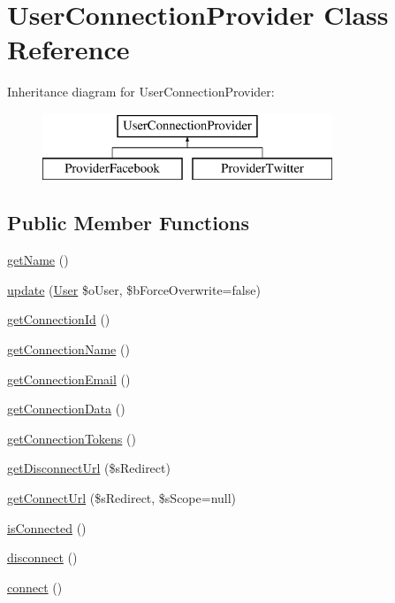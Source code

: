 \hypertarget{class_user_connection_provider}{\section{User\-Connection\-Provider Class Reference}
\label{class_user_connection_provider}
}
Inheritance diagram for User\-Connection\-Provider\-:\begin{figure}[H]
\begin{center}
\leavevmode
\includegraphics[height=2.000000cm]{class_user_connection_provider}
\end{center}
\end{figure}
\subsection*{Public Member Functions}
\begin{DoxyCompactItemize}
\item 
\hyperlink{class_user_connection_provider_a44ddc4806292a57a3d46267f85fcb8b2}{get\-Name} ()
\item 
\hyperlink{class_user_connection_provider_a8ba8b5a529e6f20c8b243368862120b8}{update} (\hyperlink{class_user}{User} \$o\-User, \$b\-Force\-Overwrite=false)
\item 
\hyperlink{class_user_connection_provider_ab1d2c9bb70f491f514b7c16c558f0777}{get\-Connection\-Id} ()
\item 
\hyperlink{class_user_connection_provider_a51cc299a8ba01d2a7d2a26b146cedc08}{get\-Connection\-Name} ()
\item 
\hyperlink{class_user_connection_provider_a0155cc7f100de785220b81361e4d7021}{get\-Connection\-Email} ()
\item 
\hyperlink{class_user_connection_provider_adc340342b987e52cbb96ef4006566694}{get\-Connection\-Data} ()
\item 
\hyperlink{class_user_connection_provider_ab646bdaf89b832246af303efae5a6a50}{get\-Connection\-Tokens} ()
\item 
\hyperlink{class_user_connection_provider_a1bda2ec75dd12b1b73510780f8ba9094}{get\-Disconnect\-Url} (\$s\-Redirect)
\item 
\hyperlink{class_user_connection_provider_abb1139d2d575d13f24e509c97d31b6c4}{get\-Connect\-Url} (\$s\-Redirect, \$s\-Scope=null)
\item 
\hyperlink{class_user_connection_provider_a9b5c8d50b9e3e9641aed1b8ddba69e17}{is\-Connected} ()
\item 
\hyperlink{class_user_connection_provider_a40db3277b904ccd1685a86a17f2475b2}{disconnect} ()
\item 
\hyperlink{class_user_connection_provider_a583fd17c4a06932ccf11eb79207aea0f}{connect} ()
\end{DoxyCompactItemize}


